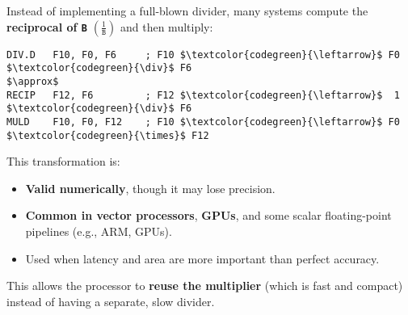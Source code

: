 \noindent
Instead of implementing a full-blown divider, many systems compute the \textbf{reciprocal of \texttt{B}} $\left(\frac{1}{\texttt{B}}\right)$ and then multiply:
\begin{lstlisting}[language=unknown, mathescape=true]
DIV.D   F10, F0, F6     ; F10 $\textcolor{codegreen}{\leftarrow}$ F0 $\textcolor{codegreen}{\div}$ F6
$\approx$
RECIP   F12, F6         ; F12 $\textcolor{codegreen}{\leftarrow}$  1 $\textcolor{codegreen}{\div}$ F6
MULD    F10, F0, F12    ; F10 $\textcolor{codegreen}{\leftarrow}$ F0 $\textcolor{codegreen}{\times}$ F12
\end{lstlisting}
This transformation is:
\begin{itemize}
    \item \textbf{Valid numerically}, though it may lose precision.
    \item \textbf{Common in vector processors}, \textbf{GPUs}, and some scalar floating-point pipelines (e.g., ARM, GPUs).
    \item Used when latency and area are more important than perfect accuracy.
\end{itemize}
This allows the processor to \textbf{reuse the multiplier} (which is fast and compact) instead of having a separate, slow divider.

